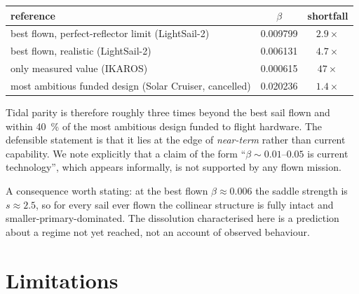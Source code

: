 \documentclass[11pt,a4paper]{article}
\begin{document}
\begin{center}
\begin{tabular}{lcc}
  \toprule
  reference & $\beta$ & shortfall \\
  \midrule
  best flown, perfect-reflector limit (LightSail-2) & \num{0.009799} & $2.9\times$ \\
  best flown, realistic (LightSail-2)               & \num{0.006131} & $4.7\times$ \\
  only measured value (IKAROS)                      & \num{0.000615} & $47\times$ \\
  most ambitious funded design (Solar Cruiser, cancelled) & \num{0.020236} & $1.4\times$ \\
  \bottomrule
\end{tabular}
\end{center}

Tidal parity is therefore roughly three times beyond the best sail flown and
within \SI{40}{\percent} of the most ambitious design funded to flight hardware.
The defensible statement is that it lies at the edge of \emph{near-term} rather
than current capability. We note explicitly that a claim of the form
``$\beta\sim0.01$--$0.05$ is current technology'', which appears informally, is
not supported by any flown mission.

A consequence worth stating: at the best flown $\beta\approx0.006$ the saddle
strength is $s\approx2.5$, so for every sail ever flown the collinear structure
is fully intact and smaller-primary-dominated. The dissolution characterised
here is a prediction about a regime not yet reached, not an account of observed
behaviour.

\section{Limitations}\label{sec:limits}
\end{document}
